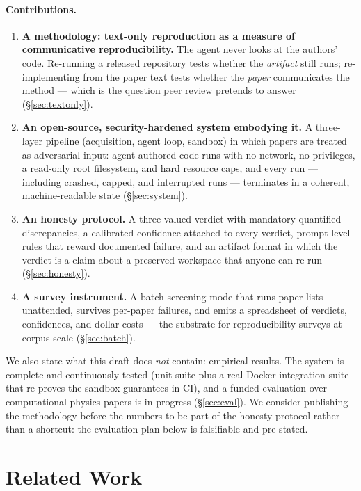 \documentclass[10pt]{article}
\begin{document}
\paragraph{Contributions.}
\begin{enumerate}
  \item \textbf{A methodology: text-only reproduction as a measure of communicative reproducibility.} The agent never looks at the authors' code. Re-running a released repository tests whether the \emph{artifact} still runs; re-implementing from the paper text tests whether the \emph{paper} communicates the method --- which is the question peer review pretends to answer (\S\ref{sec:textonly}).
  \item \textbf{An open-source, security-hardened system embodying it.} A three-layer pipeline (acquisition, agent loop, sandbox) in which papers are treated as adversarial input: agent-authored code runs with no network, no privileges, a read-only root filesystem, and hard resource caps, and every run --- including crashed, capped, and interrupted runs --- terminates in a coherent, machine-readable state (\S\ref{sec:system}).
  \item \textbf{An honesty protocol.} A three-valued verdict with mandatory quantified discrepancies, a calibrated confidence attached to every verdict, prompt-level rules that reward documented failure, and an artifact format in which the verdict is a claim about a preserved workspace that anyone can re-run (\S\ref{sec:honesty}).
  \item \textbf{A survey instrument.} A batch-screening mode that runs paper lists unattended, survives per-paper failures, and emits a spreadsheet of verdicts, confidences, and dollar costs --- the substrate for reproducibility surveys at corpus scale (\S\ref{sec:batch}).
\end{enumerate}

We also state what this draft does \emph{not} contain: empirical results. The system is complete and continuously tested (unit suite plus a real-Docker integration suite that re-proves the sandbox guarantees in CI), and a funded evaluation over computational-physics papers is in progress (\S\ref{sec:eval}). We consider publishing the methodology before the numbers to be part of the honesty protocol rather than a shortcut: the evaluation plan below is falsifiable and pre-stated.

\section{Related Work}\label{sec:related}
\end{document}
